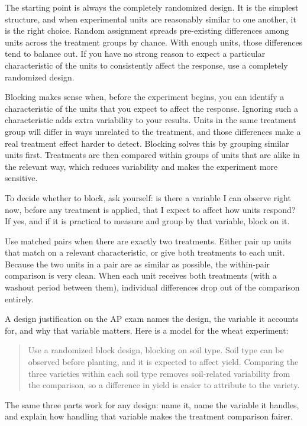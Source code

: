 The starting point is always the completely randomized design. It is the simplest structure, and when experimental units are reasonably similar to one another, it is the right choice. Random assignment spreads pre-existing differences among units across the treatment groups by chance. With enough units, those differences tend to balance out. If you have no strong reason to expect a particular characteristic of the units to consistently affect the response, use a completely randomized design. 

Blocking makes sense when, before the experiment begins, you can identify a characteristic of the units that you expect to affect the response. Ignoring such a characteristic adds extra variability to your results. Units in the same treatment group will differ in ways unrelated to the treatment, and those differences make a real treatment effect harder to detect. Blocking solves this by grouping similar units first. Treatments are then compared within groups of units that are alike in the relevant way, which reduces variability and makes the experiment more sensitive.

To decide whether to block, ask yourself: is there a variable I can observe right now, before any treatment is applied, that I expect to affect how units respond? If yes, and if it is practical to measure and group by that variable, block on it.

Use matched pairs when there are exactly two treatments. Either pair up units that match on a relevant characteristic, or give both treatments to each unit. Because the two units in a pair are as similar as possible, the within-pair comparison is very clean. When each unit receives both treatments (with a washout period between them), individual differences drop out of the comparison entirely.

A design justification on the AP exam names the design, the variable it accounts for, and why that variable matters. Here is a model for the wheat experiment:

\begin{quote}
Use a randomized block design, blocking on soil type. Soil type can be observed before planting, and it is expected to affect yield. Comparing the three varieties within each soil type removes soil-related variability from the comparison, so a difference in yield is easier to attribute to the variety.
\end{quote}

The same three parts work for any design: name it, name the variable it handles, and explain how handling that variable makes the treatment comparison fairer.

